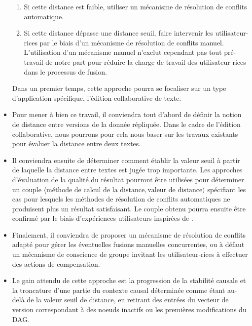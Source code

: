 \begin{itemize}
        \begin{enumerate}
            \item Si cette distance est faible, utiliser un mécanisme de résolution de conflits automatique.
            \item Si cette distance dépasse une distance seuil, faire intervenir les utilisateur-rices par le biais d'un mécanisme de résolution de conflits manuel.
                L'utilisation d'un mécanisme manuel n'exclut cependant pas tout pré-travail de notre part pour réduire la charge de travail des utilisateur-rices dans le processus de fusion.
        \end{enumerate}
        Dans un premier temps, cette approche pourra se focaliser sur un type d'application spécifique, \eg l'édition collaborative de texte.
    \item Pour mener à bien ce travail, il conviendra tout d'abord de définir la notion de distance entre versions de la donnée répliquée.
        Dans le cadre de l'édition collaborative, nous pourrons pour cela nous baser sur les travaux existants pour évaluer la distance entre deux textes.
    \item Il conviendra ensuite de déterminer comment établir la valeur seuil à partir de laquelle la distance entre textes est jugée trop importante.
        Les approches d'évaluation de la qualité du résultat pourront être utilisées pour déterminer un couple $\langle \text{méthode de calcul de la distance}, \text{valeur de distance} \rangle$ spécifiant les cas pour lesquels les méthodes de résolution de conflits automatiques ne produisent plus un résultat satisfaisant.
        Le couple obtenu pourra ensuite être confirmé par le biais d'expériences utilisateurs inspirées de \cite{2014-effect-delay-collaborative-editing-ignat,2015-cope-delay-collaborative-note-taking-ignat}.
    \item Finalement, il conviendra de proposer un mécanisme de résolution de conflits adapté pour gérer les éventuelles fusions manuelles concurrentes, ou à défaut un mécanisme de conscience de groupe invitant les utilisateur-rices à effectuer des actions de compensation.
    \item Le gain attendu de cette approche est la progression de la stabilité causale et la troncature d'une partie du contexte causal déterminée comme étant au-delà de la valeur seuil de distance, \eg en retirant des entrées du vecteur de version correspondant à des noeuds inactifs ou les premières modifications du \ac{DAG}.
\end{itemize}

